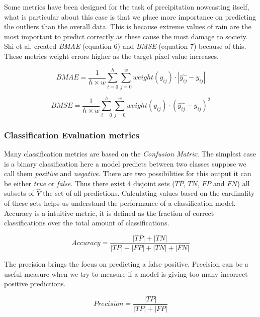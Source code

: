 Some metrics have been designed for the task of precipitation nowcasting itself, what is particular about this case is that we place more
importance on predicting the outliers than the overall data. This is because extreme values of rain are the most important to predict correctly as these cause the
most damage to society. Shi et al. \cite{shi2017deep} created \textit{BMAE} (equation 6) and \textit{BMSE} (equation 7) because of this.
These metrics weight errors higher as the target pixel value increases. 

\begin{equation}
BMAE = \frac{1}{h\times w}\sum_{i=0}^h\sum_{j=0}^w weight(y_{ij}) \cdot |\hat{y_{ij}} - y_{ij}|
\end{equation}

\begin{equation}
BMSE = \frac{1}{h\times w}\sum_{i=0}^h\sum_{j=0}^w weight(y_{ij}) \cdot (\hat{y_{ij}} -y_{ij})^2
\end{equation}


\subsubsection{Classification Evaluation metrics} Many classification metrics are based on the \textit{Confusion Matrix}.
The simplest case is a binary classification here a model predicts between two classes suppose we call them 
\textit{positive} and \textit{negative}. There are two possibilities for this output
it can be either \textit{true} or \textit{false}. Thus there exist 4 disjoint sets ($TP$, $TN$, $FP$ and $FN$) all subsets of $\hat{Y}$ the set of all predictions.
Calculating values based on the cardinality of these sets helps us understand the performance of a classification model.
Accuracy is a intuitive metric, it is defined as the fraction of correct classifications over the total amount of classifications.  

\begin{equation}
  Accuracy = \frac{|TP| + |TN|}{|TP| + |FP| + |TN| + |FN|}
\end{equation}


The precision brings the focus on predicting a false positive.
Precision can be a useful measure when we try to measure if a model
is giving too many incorrect positive predictions.

\begin{equation}
  Precision = \frac{|TP|}{|TP| + |FP|}
\end{equation}

